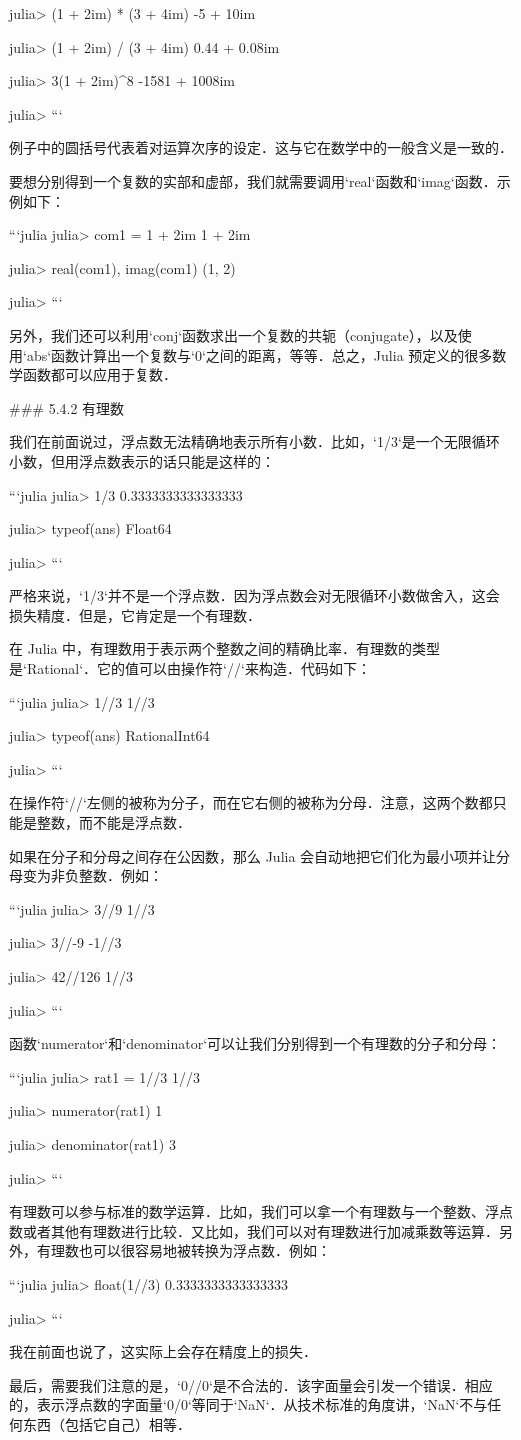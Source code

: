 julia> (1 + 2im) * (3 + 4im)
-5 + 10im

julia> (1 + 2im) / (3 + 4im)
0.44 + 0.08im

julia> 3(1 + 2im)^8
-1581 + 1008im

julia> 
```

例子中的圆括号代表着对运算次序的设定．这与它在数学中的一般含义是一致的．

要想分别得到一个复数的实部和虚部，我们就需要调用`real`函数和`imag`函数．示例如下：

```julia
julia> com1 = 1 + 2im 
1 + 2im

julia> real(com1), imag(com1)
(1, 2)

julia> 
```

另外，我们还可以利用`conj`函数求出一个复数的共轭（conjugate），以及使用`abs`函数计算出一个复数与`0`之间的距离，等等．总之，Julia 预定义的很多数学函数都可以应用于复数．

### 5.4.2 有理数

我们在前面说过，浮点数无法精确地表示所有小数．比如，`1/3`是一个无限循环小数，但用浮点数表示的话只能是这样的：

```julia
julia> 1/3
0.3333333333333333

julia> typeof(ans)
Float64

julia> 
```

严格来说，`1/3`并不是一个浮点数．因为浮点数会对无限循环小数做舍入，这会损失精度．但是，它肯定是一个有理数．

在 Julia 中，有理数用于表示两个整数之间的精确比率．有理数的类型是`Rational`．它的值可以由操作符`//`来构造．代码如下：

```julia
julia> 1//3
1//3

julia> typeof(ans)
Rational{Int64}

julia> 
```

在操作符`//`左侧的被称为分子，而在它右侧的被称为分母．注意，这两个数都只能是整数，而不能是浮点数．

如果在分子和分母之间存在公因数，那么 Julia 会自动地把它们化为最小项并让分母变为非负整数．例如：

```julia
julia> 3//9
1//3

julia> 3//-9
-1//3

julia> 42//126
1//3

julia> 
```

函数`numerator`和`denominator`可以让我们分别得到一个有理数的分子和分母：

```julia
julia> rat1 = 1//3
1//3

julia> numerator(rat1)
1

julia> denominator(rat1)
3

julia>  
```

有理数可以参与标准的数学运算．比如，我们可以拿一个有理数与一个整数、浮点数或者其他有理数进行比较．又比如，我们可以对有理数进行加减乘数等运算．另外，有理数也可以很容易地被转换为浮点数．例如：

```julia
julia> float(1//3) 
0.3333333333333333

julia> 
```

我在前面也说了，这实际上会存在精度上的损失．

最后，需要我们注意的是，`0//0`是不合法的．该字面量会引发一个错误．相应的，表示浮点数的字面量`0/0`等同于`NaN`．从技术标准的角度讲，`NaN`不与任何东西（包括它自己）相等．